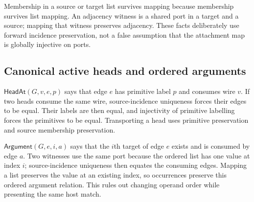 
Membership in a source or target list survives mapping because membership
survives list mapping. An adjacency witness is a shared port in a target and
a source; mapping that witness preserves adjacency. These facts deliberately
use forward incidence preservation, not a false assumption that the attachment
map is globally injective on ports.




\subsection{Canonical active heads and ordered arguments}

$\mathsf{HeadAt}(G,v,e,p)$ says that edge $e$ has primitive label $p$ and consumes
wire $v$. If two heads consume the same wire, source-incidence uniqueness
forces their edges to be equal. Their labels are then equal, and injectivity
of primitive labelling forces the primitives to be equal. Transporting a head
uses primitive preservation and source membership preservation.




$\mathsf{Argument}(G,e,i,a)$ says that the $i$th target of edge $e$ exists and
is consumed by edge $a$. Two witnesses use the same port because the ordered
list has one value at index $i$; source-incidence uniqueness then equates
the consuming edges. Mapping a list preserves the value at an existing
index, so occurrences preserve this ordered argument relation. This rules
out changing operand order while presenting the same host match.




